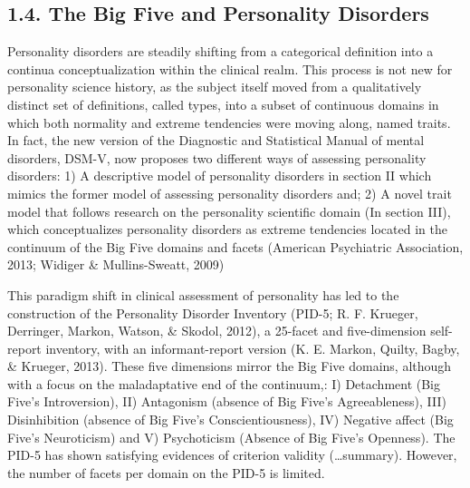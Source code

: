 \documentclass[,man,floatsintext]{apa6}
\begin{document}
\subsection{1.4. The Big Five and Personality
Disorders}\label{the-big-five-and-personality-disorders}

Personality disorders are steadily shifting from a categorical
definition into a continua conceptualization within the clinical realm.
This process is not new for personality science history, as the subject
itself moved from a qualitatively distinct set of definitions, called
types, into a subset of continuous domains in which both normality and
extreme tendencies were moving along, named traits. In fact, the new
version of the Diagnostic and Statistical Manual of mental disorders,
DSM-V, now proposes two different ways of assessing personality
disorders: 1) A descriptive model of personality disorders in section II
which mimics the former model of assessing personality disorders and; 2)
A novel trait model that follows research on the personality scientific
domain (In section III), which conceptualizes personality disorders as
extreme tendencies located in the continuum of the Big Five domains and
facets (American Psychiatric Association, 2013; Widiger \&
Mullins-Sweatt, 2009)

This paradigm shift in clinical assessment of personality has led to the
construction of the Personality Disorder Inventory (PID-5; R. F.
Krueger, Derringer, Markon, Watson, \& Skodol, 2012), a 25-facet and
five-dimension self-report inventory, with an informant-report version
(K. E. Markon, Quilty, Bagby, \& Krueger, 2013). These five dimensions
mirror the Big Five domains, although with a focus on the maladaptative
end of the continuum,: I) Detachment (Big Five's Introversion), II)
Antagonism (absence of Big Five's Agreeableness), III) Disinhibition
(absence of Big Five's Conscientiousness), IV) Negative affect (Big
Five's Neuroticism) and V) Psychoticism (Absence of Big Five's
Openness). The PID-5 has shown satisfying evidences of criterion
validity (\ldots{}summary). However, the number of facets per domain on
the PID-5 is limited.
\end{document}
